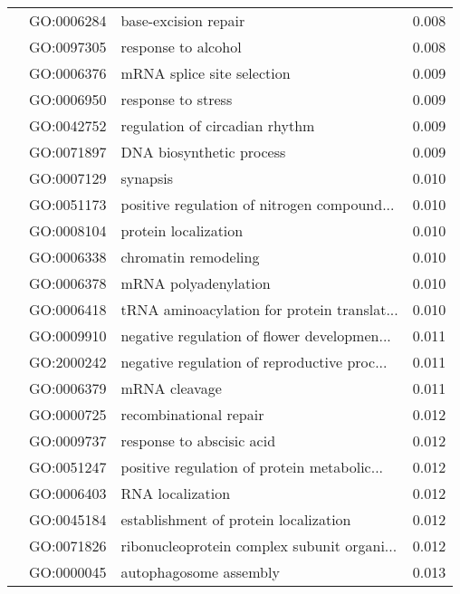 \begin{longtable}{lllr}
   & GO:0006284 &                         base-excision repair &         0.008 \\
   & GO:0097305 &                          response to alcohol &         0.008 \\
   & GO:0006376 &                   mRNA splice site selection &         0.009 \\
   & GO:0006950 &                           response to stress &         0.009 \\
   & GO:0042752 &               regulation of circadian rhythm &         0.009 \\
   & GO:0071897 &                     DNA biosynthetic process &         0.009 \\
   & GO:0007129 &                                     synapsis &         0.010 \\
   & GO:0051173 &  positive regulation of nitrogen compound... &         0.010 \\
   & GO:0008104 &                         protein localization &         0.010 \\
   & GO:0006338 &                         chromatin remodeling &         0.010 \\
   & GO:0006378 &                         mRNA polyadenylation &         0.010 \\
   & GO:0006418 &  tRNA aminoacylation for protein translat... &         0.010 \\
   & GO:0009910 &  negative regulation of flower developmen... &         0.011 \\
   & GO:2000242 &  negative regulation of reproductive proc... &         0.011 \\
   & GO:0006379 &                                mRNA cleavage &         0.011 \\
   & GO:0000725 &                       recombinational repair &         0.012 \\
   & GO:0009737 &                    response to abscisic acid &         0.012 \\
   & GO:0051247 &  positive regulation of protein metabolic... &         0.012 \\
   & GO:0006403 &                             RNA localization &         0.012 \\
   & GO:0045184 &        establishment of protein localization &         0.012 \\
   & GO:0071826 &  ribonucleoprotein complex subunit organi... &         0.012 \\
   & GO:0000045 &                       autophagosome assembly &         0.013 \\

\end{longtable}
